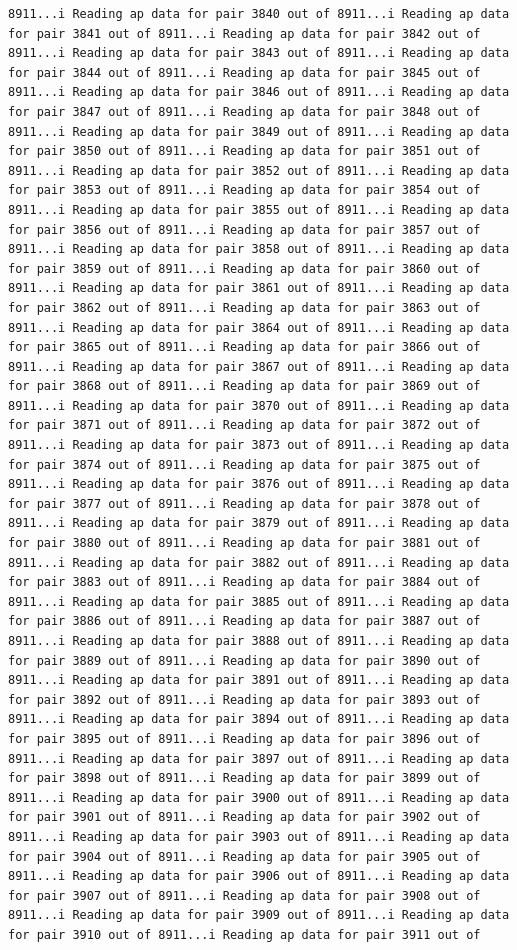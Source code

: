 \documentclass[
]{article}
\begin{document}
\begin{verbatim}
8911...i Reading ap data for pair 3840 out of 8911...i Reading ap data for pair 3841 out of 8911...i Reading ap data for pair 3842 out of 8911...i Reading ap data for pair 3843 out of 8911...i Reading ap data for pair 3844 out of 8911...i Reading ap data for pair 3845 out of 8911...i Reading ap data for pair 3846 out of 8911...i Reading ap data for pair 3847 out of 8911...i Reading ap data for pair 3848 out of 8911...i Reading ap data for pair 3849 out of 8911...i Reading ap data for pair 3850 out of 8911...i Reading ap data for pair 3851 out of 8911...i Reading ap data for pair 3852 out of 8911...i Reading ap data for pair 3853 out of 8911...i Reading ap data for pair 3854 out of 8911...i Reading ap data for pair 3855 out of 8911...i Reading ap data for pair 3856 out of 8911...i Reading ap data for pair 3857 out of 8911...i Reading ap data for pair 3858 out of 8911...i Reading ap data for pair 3859 out of 8911...i Reading ap data for pair 3860 out of 8911...i Reading ap data for pair 3861 out of 8911...i Reading ap data for pair 3862 out of 8911...i Reading ap data for pair 3863 out of 8911...i Reading ap data for pair 3864 out of 8911...i Reading ap data for pair 3865 out of 8911...i Reading ap data for pair 3866 out of 8911...i Reading ap data for pair 3867 out of 8911...i Reading ap data for pair 3868 out of 8911...i Reading ap data for pair 3869 out of 8911...i Reading ap data for pair 3870 out of 8911...i Reading ap data for pair 3871 out of 8911...i Reading ap data for pair 3872 out of 8911...i Reading ap data for pair 3873 out of 8911...i Reading ap data for pair 3874 out of 8911...i Reading ap data for pair 3875 out of 8911...i Reading ap data for pair 3876 out of 8911...i Reading ap data for pair 3877 out of 8911...i Reading ap data for pair 3878 out of 8911...i Reading ap data for pair 3879 out of 8911...i Reading ap data for pair 3880 out of 8911...i Reading ap data for pair 3881 out of 8911...i Reading ap data for pair 3882 out of 8911...i Reading ap data for pair 3883 out of 8911...i Reading ap data for pair 3884 out of 8911...i Reading ap data for pair 3885 out of 8911...i Reading ap data for pair 3886 out of 8911...i Reading ap data for pair 3887 out of 8911...i Reading ap data for pair 3888 out of 8911...i Reading ap data for pair 3889 out of 8911...i Reading ap data for pair 3890 out of 8911...i Reading ap data for pair 3891 out of 8911...i Reading ap data for pair 3892 out of 8911...i Reading ap data for pair 3893 out of 8911...i Reading ap data for pair 3894 out of 8911...i Reading ap data for pair 3895 out of 8911...i Reading ap data for pair 3896 out of 8911...i Reading ap data for pair 3897 out of 8911...i Reading ap data for pair 3898 out of 8911...i Reading ap data for pair 3899 out of 8911...i Reading ap data for pair 3900 out of 8911...i Reading ap data for pair 3901 out of 8911...i Reading ap data for pair 3902 out of 8911...i Reading ap data for pair 3903 out of 8911...i Reading ap data for pair 3904 out of 8911...i Reading ap data for pair 3905 out of 8911...i Reading ap data for pair 3906 out of 8911...i Reading ap data for pair 3907 out of 8911...i Reading ap data for pair 3908 out of 8911...i Reading ap data for pair 3909 out of 8911...i Reading ap data for pair 3910 out of 8911...i Reading ap data for pair 3911 out of 
\end{verbatim}
\end{document}
